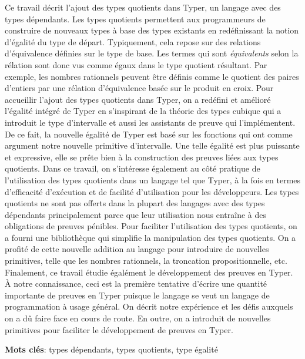 \documentclass[12pt,twoside,maitrise]{dms}
\theoremstyle{definition}
\numberwithin{equation}{section}
\numberwithin{table}{chapter}
\numberwithin{figure}{chapter}
\begin{document}
Ce travail décrit l'ajout des types quotients dans
Typer\cite{monnier2019typer}, un langage avec des types dépendants. Les types
quotients permettent aux programmeurs de construire de nouveaux types à base des
types existants en redéfinissant la notion d'égalité du type de départ.
Typiquement, cela repose sur des relations d'équivalence définies sur le type de
base. Les termes qui sont \emph{équivalents} selon la rélation sont donc vus
comme égaux dans le type quotient résultant. Par exemple, les nombres rationnels
peuvent être définis comme le quotient des paires d'entiers par une rélation
d'équivalence basée sur le produit en croix. Pour accueillir l'ajout des
types quotients dans Typer, on a redéfini et amélioré l'égalité intégré de Typer
en s'inspirant de la théorie des types cubique qui a introduit le type
d'intervalle et aussi les assistants de preuve qui l'implémentent. De ce fait,
la nouvelle égalité de Typer est basé sur les fonctions qui ont comme argument
notre nouvelle primitive d'intervalle. Une telle égalité est plus puissante et
expressive, elle se prête bien à la construction des preuves liées aux types
quotients. Dans ce travail, on s'intéresse également au côté pratique de
l'utilisation des types quotients dans un langage tel que Typer, à la fois en
termes d'efficacité d'exécution et de facilité d'utilisation pour les
développeurs. Les types quotients ne sont pas offerts dans la plupart des
langages avec des types dépendants principalement parce que leur utilisation
nous entraîne à des obligations de preuves pénibles. Pour faciliter
l'utilisation des types quotients, on a fourni une bibliothèque qui simplifie la
manipulation des types quotients. On a profité de cette nouvelle addition au
langage pour introduire de nouvelles primitives, telle que les nombres
rationnels, la troncation propositionnelle, etc. Finalement, ce travail étudie
égalément le développement des preuves en Typer. À notre connaissance, ceci est
la première tentative d'écrire une quantité importante de preuves en Typer
puisque le langage se veut un langage de programmation à usage général. On
décrit notre expérience et les défis auxquels on a dû faire face en cours de
route. En outre, on a introduit de nouvelles primitives pour faciliter le
développement de preuves en Typer.

\textbf{Mots clés}: types dépendants, types quotients, type égalité

\end{document}
